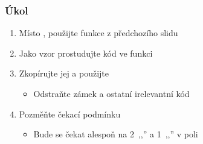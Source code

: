 \begin{frame}
  \frametitle{Úkol}

  \begin{enumerate}
    \item Místo , použijte funkce z předchozího slidu
    \item Jako vzor prostudujte kód ve funkci 

    \item Zkopírujte jej a použijte
    \begin{itemize}
      \item Odstraňte zámek a ostatní irelevantní kód
    \end{itemize}

    \item Pozměňte čekací podmínku
    \begin{itemize}
      \item Bude se čekat alespoň na 2~,,'' a 1~,,'' v poli
    \end{itemize}
  \end{enumerate}

\end{frame}
\fi


